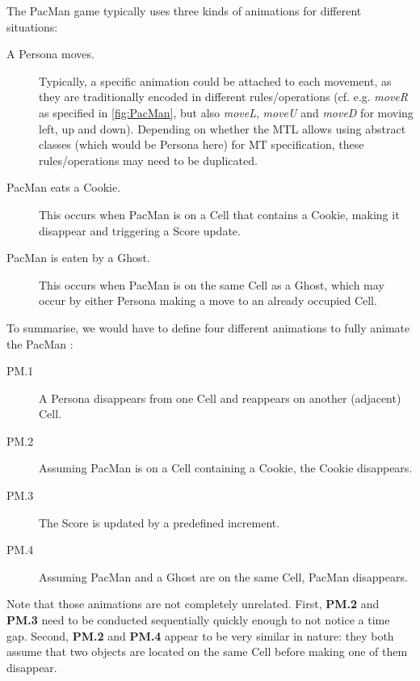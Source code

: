 The PacMan game typically uses three kinds of animations for different situations:
\begin{description}
   \item[A \textsf{Persona} moves.] Typically, a specific animation could be attached
   to each movement, as they are traditionally encoded in different rules/operations
   (cf. e.g. \textsl{moveR} as specified in \autoref{fig:PacMan}, but also 
   \textsl{moveL}, \textsl{moveU} and \textsl{moveD} for moving left, up and down).
   Depending on whether the MTL allows using abstract classes (which would be 
   \textsf{Persona} here) for MT specification, these rules/operations may need 
   to be duplicated. 
   
   \item[\textsf{PacMan} eats a \textsf{Cookie}.] This occurs when \textsf{PacMan} is on a \textsf{Cell}
   that contains a \textsf{Cookie}, making it disappear and triggering a 
   \textsf{Score} update.
   
   \item[\textsf{PacMan} is eaten by a \textsf{Ghost}.] This occurs when 
   \textsf{PacMan} is on the same \textsf{Cell} as a \textsf{Ghost}, which may occur
   by either \textsf{Persona} making a move to an already occupied \textsf{Cell}.
\end{description}
To summarise, we would have to define four different animations to fully animate
the \textsf{PacMan} \DSL:
\begin{description}
   \item[PM.1] A \textsf{Persona} disappears from one \textsf{Cell} and reappears
   on another (adjacent) \textsf{Cell}.
   
   \item[PM.2] Assuming \textsf{PacMan} is on a \textsf{Cell} containing a \textsf{Cookie},
   the \textsf{Cookie} disappears.
   
   \item[PM.3] The \textsf{Score} is updated by a predefined increment. 

   \item[PM.4] Assuming \textsf{PacMan} and a \textsf{Ghost} are on the same
   \textsf{Cell}, \textsf{PacMan} disappears.
\end{description}
Note that those animations are not completely unrelated. First, \textbf{PM.2} and
\textbf{PM.3} need to be conducted sequentially quickly enough to not notice a
time gap. Second, \textbf{PM.2} and \textbf{PM.4} appear to be very similar in
nature: they both assume that two objects are located on the same \textsf{Cell} 
before making one of them disappear.

